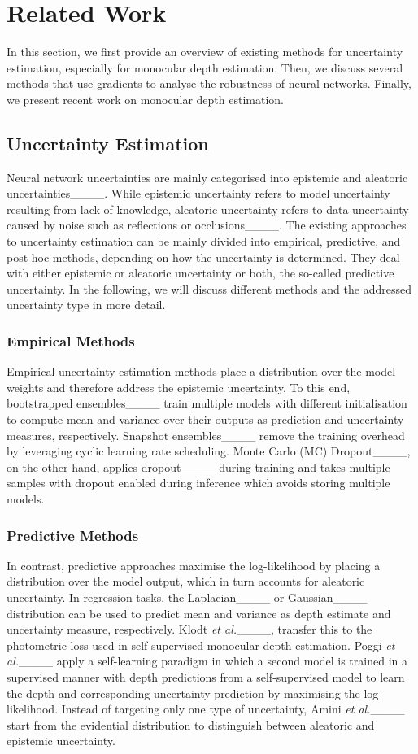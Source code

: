 \section{Related Work}
In this section, we first provide an overview of existing methods for uncertainty estimation, especially for monocular depth estimation. Then, we discuss several methods that use gradients to analyse the robustness of neural networks. Finally, we present recent work on monocular depth estimation.
\subsection{Uncertainty Estimation}
Neural network uncertainties are mainly categorised into epistemic and aleatoric uncertainties____. While epistemic uncertainty refers to model uncertainty resulting from lack of knowledge, aleatoric uncertainty refers to data uncertainty caused by noise such as reflections or occlusions____. The existing approaches to uncertainty estimation can be mainly divided into empirical, predictive, and post hoc methods, depending on how the uncertainty is determined. They deal with either epistemic or aleatoric uncertainty or both, the so-called predictive uncertainty. In the following, we will discuss different methods and the addressed uncertainty type in more detail. 
\subsubsection{Empirical Methods}
Empirical uncertainty estimation methods place a distribution over the model weights and therefore address the epistemic uncertainty. To this end, bootstrapped ensembles____ train multiple models with different initialisation to compute mean and variance over their outputs as prediction and uncertainty measures, respectively. Snapshot ensembles____ remove the training overhead by leveraging cyclic learning rate scheduling. Monte Carlo (MC) Dropout____, on the other hand, applies dropout____ during training and takes multiple samples with dropout enabled during inference which avoids storing multiple models. 
\subsubsection{Predictive Methods}
In contrast, predictive approaches maximise the log-likelihood by placing a distribution over the model output, which in turn accounts for aleatoric uncertainty. In regression tasks, the Laplacian____ or Gaussian____ distribution can be used to predict mean and variance as depth estimate and uncertainty measure, respectively. Klodt \textit{et al.}____, transfer this to the photometric loss used in self-supervised monocular depth estimation. Poggi \textit{et al.}____ apply a self-learning paradigm in which a second model is trained in a supervised manner with depth predictions from a self-supervised model to learn the depth and corresponding uncertainty prediction by maximising the log-likelihood. 
Instead of targeting only one type of uncertainty, Amini \textit{et al.}____ start from the evidential distribution to distinguish between aleatoric and epistemic uncertainty.

